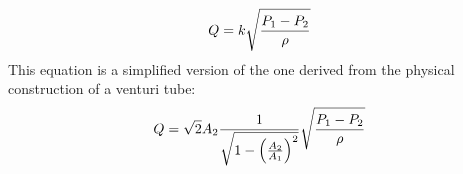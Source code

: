 \documentclass{beamer}
\begin{document}
\begin{frame}
	\frametitle{}

	



%
$$Q = k \sqrt{{P_1 - P_2} \over \rho}$$
%
This equation is a simplified version of the one derived from the physical construction of a venturi tube:
%
$$Q = \sqrt{2} A_2 {1 \over \sqrt{1 - \left({A_2 \over A_1}\right)^2}} \sqrt{{P_1 - P_2} \over \rho}$$
%
%
%
\end{frame}
\end{document}
